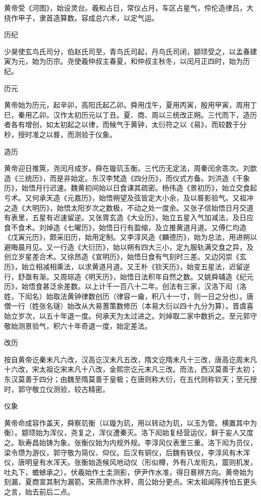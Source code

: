 \documentclass[a4paper,12pt,UTF8,twoside]{ctexbook}
\begin{document}
	黄帝受《河图》，始设灵台。羲和占日，常仪占月，车区占星气，伶伦造律吕，大挠作甲子，隶首造算数。容成总六术，以定气运。
	
	历纪
	
	少昊使玄鸟氏司分，伯赵氏司至，青鸟氏司起，丹鸟氏司闭，颛顼受之，以孟春建寅为元，始为历宗。尧使羲仲叔主春夏，和仲叔主秋冬，以闰月正四时，始为历纪。
	
	历元
	
	黄帝始为历元，起辛卯，高阳氏起乙卯。舜用戊午，夏用丙寅，殷用甲寅，周用丁巳，秦用乙卯。汉作太初历元以丁丑。夏、商、周以三统改正朔。三代而下，造历者各有增创，如太初起之以律，而候气于黄钟，太衍符之以《易》，而较数于分秒，授时准之以晷，而测验于仪象。
	
	造历
	
	黄帝迎日推筴，尧闰月成岁。舜在璇玑玉衡。三代历无定法，周秦闰余乖次。刘歆造《三统历》，而是非始定。东汉李梵造《四分历》，而仪式方备。刘洪造《干象历》，始悟月行迟速。魏黄初间始以日食课其疏密。杨伟造《景初历》，始立交食起亏术。又何承天造《元嘉历》，始悟朔望及弦皆定大小余，及以晷影验气。又祖冲之造《大明历》，始悟太阳岁次之数极，不动之处一度余。又张子信始悟日月交道有表里，五星有迟速留逆。又张胄玄造《大业历》，始立五星入气加减法，及日应食不食术。刘焯造《七曜历》，始悟日行有盈缩，及立推黄道月道。又傅仁均造《戊寅元历》，颇采旧历，始用定制。又李淳风造《麟德历》，始为总法，用进朔以避晦晨月见。又一行造《大衍历》，始以朔有四大三小，定九服轨满交食之异，及创立岁星差合术。又徐昂造《宣明历》，始悟日食有气刻时三差。又边冈崇《玄历》，始立相减相乘法，以求黄道月道。又王朴《钦天历》，始变五星法，迟留逆行，舒亟有渐。又周琮造《明天历》，始悟日法积年自然之数。又姚舜辅造《纪元历》，始悟食甚泛余差数。以上计千一百八十二年。创法有三家，汉洛下闳（洛姓，下闳名）始取法黄钟律数创历（律容一龠，积八十一寸，则一日之分也）。唐僧一行（姓张名璲）始改从大易蓍策数修历（本易大衍以四十九分为算）。晋虞喜始立岁次，以五十年退一度。何承天为太过进之。刘焯取二家中数折之。至元郭守敬始测景验气，积六十年奇退一度，始定差法。
	
	改历
	
	按自黄帝讫秦末凡六改，汉高讫汉末凡五改，隋文讫隋末凡十三改，唐高讫周末凡十六改，宋太祖讫宋末凡十八改，金熙宗讫元末凡三改。而法，西汉莫善于太初；东汉莫善于四分；由魏至隋莫善于皇极；在唐则称大衍，在五代则称钦天；至元授时，郭守敬立仪测验，较古精密。
	
	仪象
	
	黄帝命成容作盖天，舜察玑衡（以璇为玑，用以转动为玑，以玉为管。横置其中为衡）。颛顼始为浑仪，尧复之，浑仪遭秦灭。洛下闳始复经营运仪，鲜于妄人又度之。耿寿昌始铸为象。张衡仪始为内规外规。李淳风仪表里三重。洛下闳为员仪，梁令瓒为游仪，郭守敬为简仪、仰仪。后汉有铜仪，后魏有铁仪，李淳风有木浑仪，唐明皇有水浑天。张衡始造候风地动仪（形似樽，外有八龙衔丸，震则机发，吐丸下，蟾蜍承之）。伏羲始作土圭测影，伊尹作水准，得日晷辨方向。黄帝始为刻漏，夏商宣其制为漏箭。宋燕肃作水秤，周公始分更点。宋太祖闻陈抟怕五更头之言，始去前后二点。
	
\end{document}
